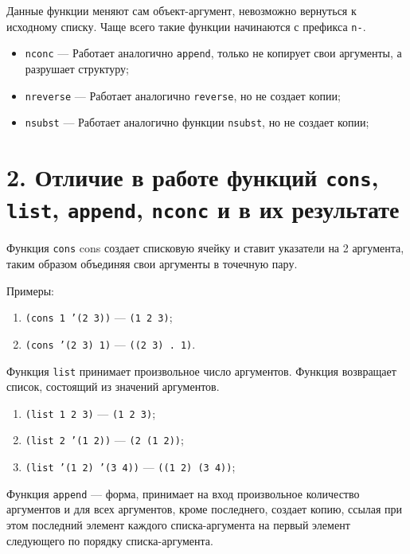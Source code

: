 Данные функции меняют сам объект-аргумент, невозможно вернуться к исходному списку. Чаще всего такие функции начинаются с префикса \texttt{n-}.

\begin{itemize}
	\item \texttt{nconc} --- Работает аналогично \texttt{append}, только не копирует свои аргументы, а разрушает структуру;
	
	\item \texttt{nreverse} --- Работает аналогично \texttt{reverse}, но не создает копии;
	
	\item \texttt{nsubst} --- Работает аналогично функции \texttt{nsubst}, но не создает копии;
	
\end{itemize}

\section*{2. Отличие в работе функций \texttt{cons}, \texttt{list}, \texttt{append}, \texttt{nconc} и в их результате}

Функция \texttt{cons} cons создает списковую ячейку и ставит указатели на 2 аргумента, таким образом объединяя свои аргументы в точечную пару.

Примеры:
\begin{enumerate}
	\item \texttt{(cons 1 '(2 3))} --- \texttt{(1 2 3)};
	\item \texttt{(cons '(2 3) 1)} --- \texttt{((2 3) . 1)}.
\end{enumerate}

Функция \texttt{list} принимает произвольное число аргументов. Функция возвращает список, состоящий из значений аргументов.

\begin{enumerate}
	\item[] \texttt{(list 1 2 3)} --- \texttt{(1 2 3)};
	\item[] \texttt{(list 2 '(1 2))} --- \texttt{(2 (1 2))};
	\item[] \texttt{(list '(1 2) '(3 4))} --- \texttt{((1 2) (3 4))};
\end{enumerate}

Функция \texttt{append} --- форма, принимает на вход произвольное количество аргументов и для всех аргументов, кроме последнего, создает копию, ссылая при этом последний элемент каждого списка-аргумента на первый элемент следующего по порядку списка-аргумента.


